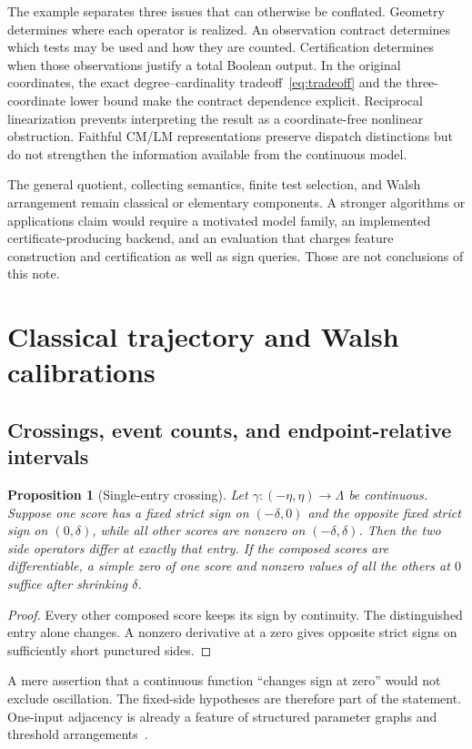 \documentclass[11pt]{article}
\newtheorem{proposition}[theorem]{Proposition}
\theoremstyle{definition}
\theoremstyle{remark}
\begin{document}
The example separates three issues that can otherwise be conflated. Geometry determines where each operator is realized. An observation contract determines which tests may be used and how they are counted. Certification determines when those observations justify a total Boolean output. In the original coordinates, the exact degree--cardinality tradeoff~\eqref{eq:tradeoff} and the three-coordinate lower bound make the contract dependence explicit. Reciprocal linearization prevents interpreting the result as a coordinate-free nonlinear obstruction. Faithful CM/LM representations preserve dispatch distinctions but do not strengthen the information available from the continuous model.

The general quotient, collecting semantics, finite test selection, and Walsh arrangement remain classical or elementary components. A stronger algorithms or applications claim would require a motivated model family, an implemented certificate-producing backend, and an evaluation that charges feature construction and certification as well as sign queries. Those are not conclusions of this note.

\appendix
\section{Classical trajectory and Walsh calibrations}\label{app:calibration}

\subsection{Crossings, event counts, and endpoint-relative intervals}
\begin{proposition}[Single-entry crossing]\label{prop:crossing}
Let $\gamma:(-\eta,\eta)\to\Lambda$ be continuous. Suppose one score has a fixed strict sign on $(-\delta,0)$ and the opposite fixed strict sign on $(0,\delta)$, while all other scores are nonzero on $(-\delta,\delta)$. Then the two side operators differ at exactly that entry. If the composed scores are differentiable, a simple zero of one score and nonzero values of all the others at $0$ suffice after shrinking $\delta$.
\end{proposition}
\begin{proof}
Every other composed score keeps its sign by continuity. The distinguished entry alone changes. A nonzero derivative at a zero gives opposite strict signs on sufficiently short punctured sides.
\end{proof}
A mere assertion that a continuous function ``changes sign at zero'' would not exclude oscillation. The fixed-side hypotheses are therefore part of the statement. One-input adjacency is already a feature of structured parameter graphs and threshold arrangements~\cite{Crawford2022,Anthony2026}.
\end{document}
